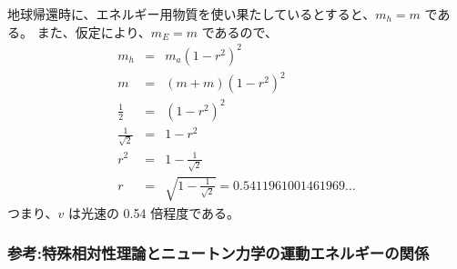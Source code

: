 地球帰還時に、エネルギー用物質を使い果たしているとすると、$m_h = m$ である。
また、仮定により、$m_E = m$ であるので、
  \begin{eqnarray}
    m_h & = & m_a(1 - r^2)^2
  \\
    m & = & (m + m) (1-r^2)^2
  \\
    \frac{1}{2} & = & (1-r^2)^2
  \\
    \frac{1}{\sqrt{2}} & = & 1-r^2
  \\
    r^2 & = & 1 - \frac{1}{\sqrt{2}}
  \\
    r & = & \sqrt{1 - \frac{1}{\sqrt{2}}} = 0.5411961001461969...
  \end{eqnarray}
つまり、$v$ は光速の 0.54 倍程度である。


\subsubsection{参考:特殊相対性理論とニュートン力学の運動エネルギーの関係}
\label{sssec:宇宙船の加速:参考}

